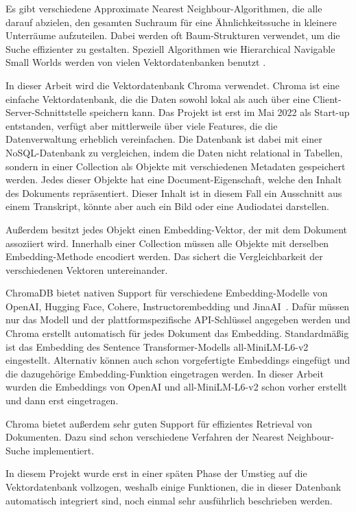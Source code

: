 Es gibt verschiedene Approximate Nearest Neighbour-Algorithmen, die alle darauf abzielen, den gesamten Suchraum für eine Ähnlichkeitssuche in kleinere Unterräume aufzuteilen.
Dabei werden oft Baum-Strukturen verwendet, um die Suche effizienter zu gestalten.
Speziell Algorithmen wie Hierarchical Navigable Small Worlds werden von vielen Vektordatenbanken benutzt \cite{malkov2020}.

In dieser Arbeit wird die Vektordatenbank Chroma verwendet.
Chroma ist eine einfache Vektordatenbank, die die Daten sowohl lokal als auch über eine Client-Server-Schnittstelle speichern kann.
Das Projekt ist erst im Mai 2022 als Start-up entstanden, verfügt aber mittlerweile über viele Features, die die Datenverwaltung erheblich vereinfachen.
Die Datenbank ist dabei mit einer NoSQL-Datenbank zu vergleichen, indem die Daten nicht relational in Tabellen, sondern in einer Collection als Objekte mit verschiedenen Metadaten gespeichert werden.
Jedes dieser Objekte hat eine Document-Eigenschaft, welche den Inhalt des Dokuments repräsentiert.
Dieser Inhalt ist in diesem Fall ein Ausschnitt aus einem Transkript, könnte aber auch ein Bild oder eine Audiodatei darstellen.

Außerdem besitzt jedes Objekt einen Embedding-Vektor, der mit dem Dokument assoziiert wird.
Innerhalb einer Collection müssen alle Objekte mit derselben Embedding-Methode encodiert werden.
Das sichert die Vergleichbarkeit der verschiedenen Vektoren untereinander.

ChromaDB bietet nativen Support für verschiedene Embedding-Modelle von OpenAI, Hugging Face, Cohere, Instructorembedding und JinaAI~\cite{chroma}.
Dafür müssen nur das Modell und der plattformspezifische API-Schlüssel angegeben werden und Chroma erstellt automatisch für jedes Dokument das Embedding.
Standardmäßig ist das Embedding des Sentence Transformer-Modells all-MiniLM-L6-v2 eingestellt.
Alternativ können auch schon vorgefertigte Embeddings eingefügt und die dazugehörige Embedding-Funktion eingetragen werden.
In dieser Arbeit wurden die Embeddings von OpenAI und all-MiniLM-L6-v2 schon vorher erstellt und dann erst eingetragen.

Chroma bietet außerdem sehr guten Support für effizientes Retrieval von Dokumenten.
Dazu sind schon verschiedene Verfahren der Nearest Neighbour-Suche implementiert.

In diesem Projekt wurde erst in einer späten Phase der Umstieg auf die Vektordatenbank vollzogen, weshalb einige Funktionen, die in dieser Datenbank automatisch integriert sind, noch einmal sehr ausführlich beschrieben werden.

